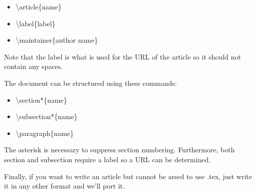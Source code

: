 \begin{itemize}
	\item{\textbackslash}article\{name\}
	\item{\textbackslash}label\{label\}
	\item{\textbackslash}maintainer\{author name\}
\end{itemize}

Note that the label is what is used for the URL of the article so it should not contain any spaces.

The document can be structured using these commands:

\begin{itemize}
	\item{\textbackslash}section*\{name\}
	\item{\textbackslash}subsection*\{name\}
	\item{\textbackslash}paragraph\{name\}
\end{itemize}

The asterisk is necessary to suppress section numbering. Furthermore, both section and subsection require a label so a URL can be determined.

Finally, if you want to write an article but cannot be arsed to use .tex, just write it in any other format and we'll port it.